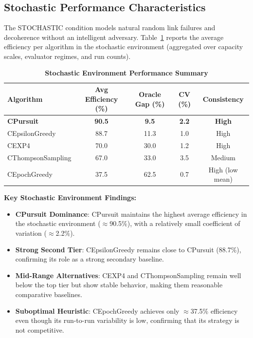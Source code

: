 \documentclass[12pt,a4paper]{article}
\newcommand{\stochastic}[1]{\textcolor{stochasticcolor}{\textbf{#1}}}
\newcommand{\critical}[1]{\textcolor{criticalcolor}{\textbf{#1}}}
\begin{document}
\begin{tcolorbox}[colback=stochasticcolor!10,colframe=stochasticcolor,title=\textbf{Stochastic Environment Deep Analysis (1$\times$–2$\times$ Capacities, T/Tb Combined)}]

\subsection{Stochastic Performance Characteristics}

The STOCHASTIC condition models natural random link failures and decoherence without an intelligent adversary. Table~\ref{tab:stoch-performance} reports the average efficiency per algorithm in the stochastic environment (aggregated over capacity scales, evaluator regimes, and run counts).

\begin{table}[H]
\centering
\caption{\stochastic{Stochastic Environment Performance Summary}}
\label{tab:stoch-performance}
\begin{tabular}{|l|c|c|c|c|}
\hline
\textbf{Algorithm} & \textbf{Avg Efficiency (\%)} & \textbf{Oracle Gap (\%)} & \textbf{CV (\%)} & \textbf{Consistency} \\
\hline
\hline
\stochastic{CPursuit}        & \stochastic{\textbf{90.5}} & \stochastic{9.5}  & \stochastic{2.2} & \stochastic{High} \\
CEpsilonGreedy               & 88.7                        & 11.3              & 1.0              & High \\
CEXP4                        & 70.0                        & 30.0              & 1.2              & High \\
CThompsonSampling            & 67.0                        & 33.0              & 3.5              & Medium \\
CEpochGreedy                 & 37.5                        & 62.5              & 0.7              & High (low mean) \\
\hline
\end{tabular}
\end{table}

\textbf{Key Stochastic Environment Findings:}
\begin{itemize}
\item \stochastic{CPursuit Dominance}: CPursuit maintains the highest average efficiency in the stochastic environment ($\approx$90.5\%), with a relatively small coefficient of variation ($\approx$2.2\%).
\item \stochastic{Strong Second Tier}: CEpsilonGreedy remains close to CPursuit (88.7\%), confirming its role as a strong secondary baseline.
\item \stochastic{Mid-Range Alternatives}: CEXP4 and CThompsonSampling remain well below the top tier but show stable behavior, making them reasonable comparative baselines.
\item \critical{Suboptimal Heuristic}: CEpochGreedy achieves only $\approx$37.5\% efficiency even though its run-to-run variability is low, confirming that its strategy is not competitive.
\end{itemize}

\end{tcolorbox}
\end{document}
